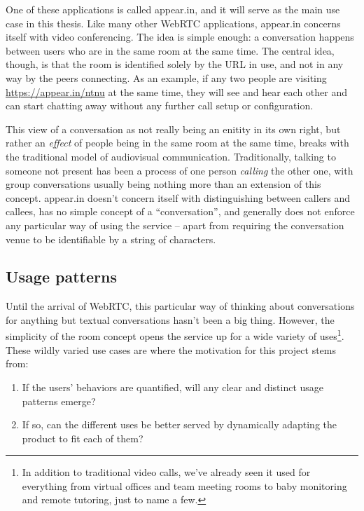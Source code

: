 One of these applications is called appear.in, and it will serve as the main use case in this thesis. Like many other WebRTC applications, appear.in concerns itself with video conferencing. The idea is simple enough: a conversation happens between users who are in the same room at the same time. The central idea, though, is that the room is identified solely by the URL in use, and not in any way by the peers connecting. As an example, if any two people are visiting \url{https://appear.in/ntnu} at the same time, they will see and hear each other and can start chatting away without any further call setup or configuration.

This view of a conversation as not really being an enitity in its own right, but rather an \emph{effect} of people being in the same room at the same time, breaks with the traditional model of audiovisual communication. Traditionally, talking to someone not present has been a process of one person \emph{calling} the other one, with group conversations usually being nothing more than an extension of this concept. appear.in doesn't concern itself with distinguishing between callers and callees, has no simple concept of a ``conversation'', and generally does not enforce any particular way of using the service -- apart from requiring the conversation venue to be identifiable by a string of characters.

\subsection{Usage patterns}

Until the arrival of WebRTC, this particular way of thinking about conversations for anything but textual conversations hasn't been a big thing. However, the simplicity of the room concept opens the service up for a wide variety of uses\footnote{In addition to traditional video calls, we've already seen it used for everything from virtual offices and team meeting rooms to baby monitoring and remote tutoring, just to name a few.}. These wildly varied use cases are where the motivation for this project stems from:

\begin{enumerate}
  \item If the users' behaviors are quantified, will any clear and distinct usage patterns emerge?
  \item If so, can the different uses be better served by dynamically adapting the product to fit each of them?
\end{enumerate}

